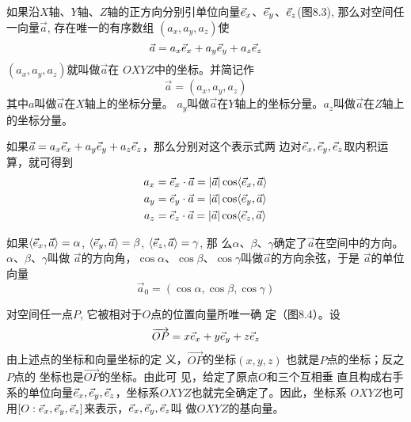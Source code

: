 \begin{figure}[htp]
    \centering
{}
    \caption{}
\end{figure}


如果沿$X$轴、$Y$轴、$Z$轴的正方向分别引单位向量$\vec{e}_x$、$\vec{e}_y$、$\vec{e}_z$(图8.3), 那么对空间任一向量$\vec{a}$, 存在唯一的有序数组
$(a_x,a_y,a_z)$使
\[\vec{a}=a_x\vec{e}_x+a_y\vec{e}_y+a_z\vec{e}_z\]
$(a_x,a_y,a_z)$就叫做$\vec{a}$在
$OXYZ$中的坐标。并简记作
\[\vec{a}=(a_x,a_y,a_z)\]
其中$a$叫做$\vec{a}$在$X$轴上的坐标分量。
$a_y$叫做$\vec{a}$在$Y$轴上的坐标分量。$a_z$叫做$\vec{a}$在$Z$轴上的坐标分量。

如果$\vec{a}=a_x\vec{e}_x+a_y\vec{e}_y+a_z\vec{e}_z$，那么分别对这个表示式两
边对$\vec{e}_x,\vec{e}_y,\vec{e}_z$取内积运算，就可得到
\[\begin{split}
    a_x&=\vec{e}_x\cdot \vec{a}=|\vec{a}|\cos\langle \vec{e}_x,\vec{a} \rangle \\
    a_y&=\vec{e}_y\cdot \vec{a}=|\vec{a}|\cos\langle \vec{e}_y,\vec{a} \rangle \\
    a_z&=\vec{e}_z\cdot \vec{a}=|\vec{a}|\cos\langle \vec{e}_z,\vec{a} \rangle \\
\end{split}\]

如果$\langle \vec{e}_x,\vec{a} \rangle=\alpha$, $\langle \vec{e}_y,\vec{a} \rangle=\beta$, $\langle \vec{e}_z,\vec{a} \rangle=\gamma$, 那
么$\alpha$、$\beta$、$\gamma$确定了$\vec{a}$在空间中的方向。$\alpha$、$\beta$、$\gamma$叫做
$\vec{a}$的方向角，$\cos\alpha$、$\cos\beta$、$\cos\gamma$叫做$\vec{a}$的方向余弦，于是
$\vec{a}$的单位向量
\[\vec{a}_0=(\cos\alpha, \cos\beta, \cos\gamma)\]

对空间任一点$P$, 它被相对于$O$点的位置向量所唯一确
定（图8.4）。设
\[\overrightarrow{OP}=x\vec{e}_x+y\vec{e}_y+z\vec{e}_z\]
由上述点的坐标和向量坐标的定
义，$\Vec{OP}$的坐标$(x,y,z)$
也就是$P$点的坐标；反之$P$点的
坐标也是$\Vec{OP}$的坐标。由此可
见，给定了原点$O$和三个互相垂
直且构成右手系的单位向量$\vec{e}_x,\vec{e}_y,\vec{e}_z$，坐标系$OXYZ$也就完全确定了。因此，坐标系
$OXYZ$也可用$[O:\vec{e}_x,\vec{e}_y,\vec{e}_z]$来表示，$\vec{e}_x,\vec{e}_y,\vec{e}_z$叫
做$OXYZ$的基向量。

